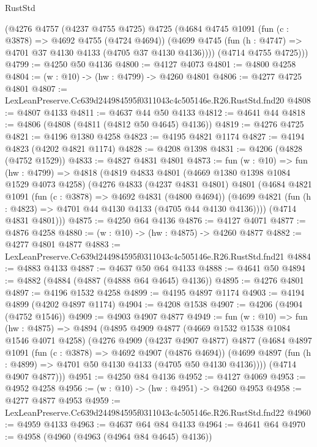 \begin{lexlean}{RustStd}
\begin{coremodule}
      (@4276
        @4757
        (@4237 @4755 @4725)
        @4725
        (@4684
          @4745
          @1091
          (fun (c : @3878) => @4692 @4755 (@4724 @4694))
          (@4699 @4745 (fun (h : @4747) => @4701 @37 @4130 @4133 (@4705 @37 @4130 @4136))))
        (@4714 @4755 @4725)))
@4799 := @4250 @50 @4136
@4800 := @4127 @4073
@4801 := @4800 @4258
@4804 := (w : @10) -> (hw : @4799) -> @4260 @4801
@4806 := @4277 @4725 @4801
@4807 := LexLeanPreserve.Cc639d244984595f0311043c4c505146e.R26.RustStd.fnd20
@4808 := @4807 @4133
@4811 := @4637 @44 @50 @4133
@4812 := @4641 @44
@4818 := @4806 (@4808 (@4811 (@4812 @50 @4645) @4136))
@4819 := @4276 @4725
@4821 := @4196 @1380 @4258
@4823 := @4195 @4821 @1174
@4827 := @4194 @4823 (@4202 @4821 @1174)
@4828 := @4208 @1398
@4831 := @4206 (@4828 (@4752 @1529))
@4833 := @4827 @4831 @4801
@4873 := fun (w : @10) =>
  fun (hw : @4799) =>
  @4818
    (@4819
      @4833
      @4801
      (@4669 @1380 @1398 @1084 @1529 @4073 @4258)
      (@4276
        @4833
        (@4237 @4831 @4801)
        @4801
        (@4684
          @4821
          @1091
          (fun (c : @3878) => @4692 @4831 (@4800 @4694))
          (@4699 @4821 (fun (h : @4823) => @4701 @44 @4130 @4133 (@4705 @44 @4130 @4136))))
        (@4714 @4831 @4801)))
@4875 := @4250 @64 @4136
@4876 := @4127 @4071
@4877 := @4876 @4258
@4880 := (w : @10) -> (hw : @4875) -> @4260 @4877
@4882 := @4277 @4801 @4877
@4883 := LexLeanPreserve.Cc639d244984595f0311043c4c505146e.R26.RustStd.fnd21
@4884 := @4883 @4133
@4887 := @4637 @50 @64 @4133
@4888 := @4641 @50
@4894 := @4882 (@4884 (@4887 (@4888 @64 @4645) @4136))
@4895 := @4276 @4801
@4897 := @4196 @1532 @4258
@4899 := @4195 @4897 @1174
@4903 := @4194 @4899 (@4202 @4897 @1174)
@4904 := @4208 @1538
@4907 := @4206 (@4904 (@4752 @1546))
@4909 := @4903 @4907 @4877
@4949 := fun (w : @10) =>
  fun (hw : @4875) =>
  @4894
    (@4895
      @4909
      @4877
      (@4669 @1532 @1538 @1084 @1546 @4071 @4258)
      (@4276
        @4909
        (@4237 @4907 @4877)
        @4877
        (@4684
          @4897
          @1091
          (fun (c : @3878) => @4692 @4907 (@4876 @4694))
          (@4699 @4897 (fun (h : @4899) => @4701 @50 @4130 @4133 (@4705 @50 @4130 @4136))))
        (@4714 @4907 @4877)))
@4951 := @4250 @84 @4136
@4952 := @4127 @4069
@4953 := @4952 @4258
@4956 := (w : @10) -> (hw : @4951) -> @4260 @4953
@4958 := @4277 @4877 @4953
@4959 := LexLeanPreserve.Cc639d244984595f0311043c4c505146e.R26.RustStd.fnd22
@4960 := @4959 @4133
@4963 := @4637 @64 @84 @4133
@4964 := @4641 @64
@4970 := @4958 (@4960 (@4963 (@4964 @84 @4645) @4136))

\end{coremodule}
\end{lexlean}
